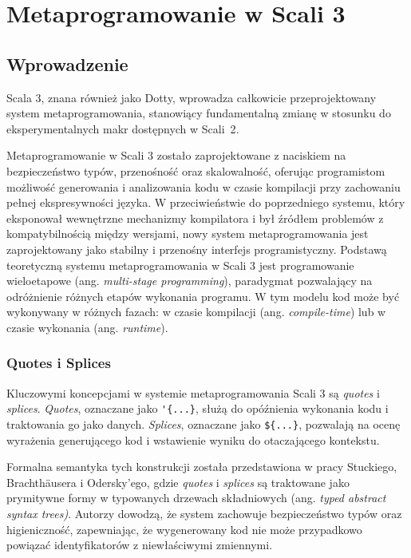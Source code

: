 \chapter{Metaprogramowanie w Scali 3}\label{ch:metaprogramowanie-w-scali-3}


\section{Wprowadzenie}\label{sec:wprowadzenie}
Scala 3, znana również jako Dotty, wprowadza całkowicie przeprojektowany system metaprogramowania, stanowiący fundamentalną zmianę w stosunku do eksperymentalnych makr dostępnych w Scali~2\cite{scala3-dropped-scala2-macros,scala3-metaprogramming}.

Metaprogramowanie w Scali 3 zostało zaprojektowane z naciskiem na bezpieczeństwo typów, przenośność oraz skalowalność, oferując programistom możliwość generowania i analizowania kodu w czasie kompilacji przy zachowaniu pełnej ekspresywności języka\cite{stucki2024infoscience,stucki2020inlining}.
W przeciwieństwie do poprzedniego systemu, który eksponował wewnętrzne mechanizmy kompilatora i był źródłem problemów z kompatybilnością między wersjami\cite{stucki2020thesis}, nowy system metaprogramowania jest zaprojektowany jako stabilny i przenośny interfejs programistyczny.
Podstawą teoretyczną systemu metaprogramowania w Scali 3 jest programowanie wieloetapowe (ang. \textit{multi-stage programming}), paradygmat pozwalający na odróżnienie różnych etapów wykonania programu\cite{scala3-staging,stucki2020thesis}.
W tym modelu kod może być wykonywany w różnych fazach: w czasie kompilacji (ang. \textit{compile-time}) lub w czasie wykonania (ang. \textit{runtime})\cite{scala3-staging}.

\subsection{Quotes i Splices}\label{subsec:cytaty-i-wstawki}
Kluczowymi koncepcjami w systemie metaprogramowania Scali 3 są \textit{quotes} i \textit{splices}\cite{stucki2018unification,stucki2021multistage}.
\textit{Quotes}, oznaczane jako \verb|'{...}|, służą do opóźnienia wykonania kodu i traktowania go jako danych\cite{scala3-reflection,epfl-dotty-reflection}.
\textit{Splices}, oznaczane jako \verb|${...}|, pozwalają na ocenę wyrażenia generującego kod i wstawienie wyniku do otaczającego kontekstu\cite{scala3-reflection,epfl-dotty-reflection,scala3-guides-quotes}.

Formalna semantyka tych konstrukcji została przedstawiona w pracy Stuckiego, Brachthäusera i Odersky'ego\cite{stucki2021multistage}, gdzie \textit{quotes} i \textit{splices} są traktowane jako prymitywne formy w typowanych drzewach składniowych (ang. \textit{typed abstract syntax trees)}.
Autorzy dowodzą, że system zachowuje bezpieczeństwo typów oraz higieniczność, zapewniając, że wygenerowany kod nie może przypadkowo powiązać identyfikatorów z niewłaściwymi zmiennymi\cite{stucki2021multistage}.

